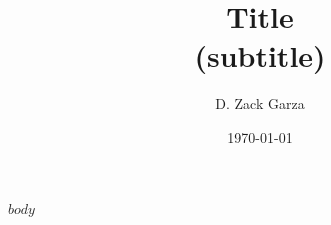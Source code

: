 

\title{
	\textbf{Title}\\
	{\normalsize (subtitle)}
}
\author{D. Zack Garza}
\date{\today}



\maketitle{}
\tableofcontents


$body$

\listoftodos




